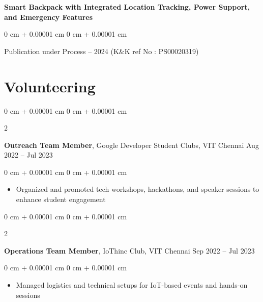 \documentclass[10pt, letterpaper]{article}
\newenvironment{highlights}{
    \begin{itemize}[
        topsep=0.10 cm,
        parsep=0.10 cm,
        partopsep=0pt,
        itemsep=0pt,
        leftmargin=0 cm + 10pt
    ]
}{
    \end{itemize}
} %
\newenvironment{onecolentry}{
    \begin{adjustwidth}{
        0 cm + 0.00001 cm
    }{
        0 cm + 0.00001 cm
    }
}{
    \end{adjustwidth}
} %
\newenvironment{twocolentry}[2][]{
    \onecolentry
    \def\secondColumn{#2}
    \setcolumnwidth{\fill, 4.5 cm}
    \begin{paracol}{2}
}{
    \switchcolumn \raggedleft \secondColumn
    \end{paracol}
    \endonecolentry
} %
\begin{document}
         \begin{samepage}
     \textbf{Smart Backpack with Integrated Location Tracking, Power Support, and Emergency Features  }
      \vspace{0.05 cm}
      
      \begin{onecolentry}
               Publication under Process – 2024 (K\&K ref No : PS00020319)  
               
               \vspace{0.05 cm}
        \end{onecolentry}
        \end{samepage}
        
 \section{Volunteering}

    \begin{twocolentry}{
            Aug 2022 – Jul 2023 
        }
            \textbf{Outreach Team Member}, Google Developer Student Clubs, VIT Chennai \end{twocolentry}

        \vspace{0.10 cm}
        \begin{onecolentry}
            \begin{highlights}
                \item Organized and promoted tech workshops, hackathons, and speaker sessions to enhance student engagement 
            \end{highlights}
        \end{onecolentry}

        \vspace{0.2 cm}
        
        \begin{twocolentry}{
            Sep 2022 – Jul 2023 
        }
            \textbf{Operations Team Member}, IoThinc Club, VIT Chennai \end{twocolentry}

        \vspace{0.10 cm}
        \begin{onecolentry}
            \begin{highlights}
                \item Managed logistics and technical setups for IoT-based events and hands-on sessions 
            \end{highlights}
        \end{onecolentry}
         \vspace{0.2 cm}
        
\end{document}

